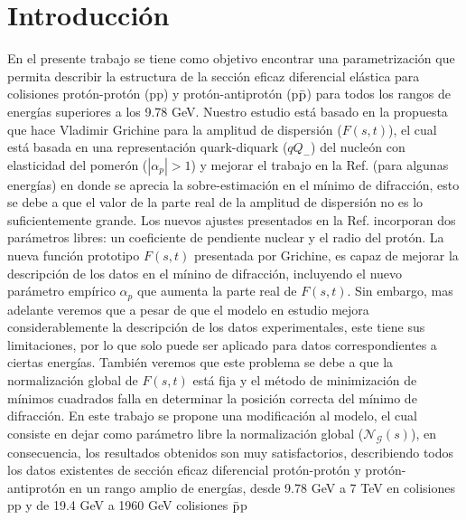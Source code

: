 \section{Introducción} 
En el presente trabajo se tiene como objetivo encon\-trar una parametrizaci\'on que permita describir la estructura de la sección eficaz diferencial el\'astica para colisiones prot\'on-prot\'on (pp) y prot\'on-antiprot\'on (p$\bar{\textup{p}}$) para todos los rangos de energías superiores a los 9.78 GeV. Nuestro estudio est\'a basado en la pro\-puesta que hace Vladimir Grichine para la amplitud de dispersi\'on ($F(s,t)$), el cual est\'a basada en una representación quark-diquark ($qQ_{-}$) del nucleón con elasticidad del pomerón ($|\alpha_p|>1$) y mejorar el trabajo en la Ref.\cite{modeloqQ} (para algunas energías) en donde se aprecia la sobre-estimación en el mínimo de difracción, esto se debe a que el valor de la parte real de la amplitud de dispersión no es lo suficientemente grande. Los nuevos ajustes presentados en la Ref.\cite{grichine}  incorporan dos parámetros libres: un coeficiente de pendiente nuclear y el radio del prot\'on. La nueva función  prototipo $F(s,t)$ presentada por Grichine, es capaz de mejorar la descripción de los datos en el m\'inino de difracción, incluyendo el nuevo parámetro empírico $\alpha_p$ que aumenta la parte real de $F(s,t)$. Sin embar\-go, mas adelante  veremos  que a pesar de que el modelo en estudio mejora considerablemente la descripción de los datos experimentales, este tiene sus limitaciones, por lo que solo puede ser aplicado para datos correspondientes a ciertas energías. También veremos que este proble\-ma se debe a que la normalización global de $F(s,t)$ est\'a fija y el método de minimización de mínimos cuadrados falla en determinar la posición correcta del mínimo de difracción. En este trabajo se propone u\-na modificación al modelo, el cual consiste en dejar como parámetro libre la normalización global ($\mathcal{N_{G}}(s)$), en consecuencia, los resultados obtenidos son muy satisfactorios, describiendo todos los datos existentes de sección eficaz diferencial protón-protón y protón-antiprotón en un rango amplio de energías, desde 9.78 GeV a 7 TeV en colisiones pp y de 19.4 GeV a 1960 GeV  colisiones $\bar{\textup{p}}$p 
